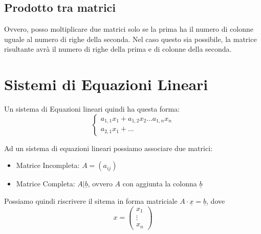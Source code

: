 \subsection{Prodotto tra matrici}
Ovvero, posso moltiplicare due matrici solo se la prima ha il numero di colonne uguale al numero di righe della seconda.
Nel caso questo sia possibile, la matrice risultante avrà il numero di righe della prima e di colonne della seconda.


\section{Sistemi di Equazioni Lineari}
Un sistema di Equazioni lineari quindi ha questa forma:
\[
	\begin{cases}
		a_{1,1} x_1 + a_{1,2}x_2 ... a_{1,n} x_n \\
		a_{2,1} x_1 + ...
	\end{cases}
\]

Ad un sistema di equazioni lineari possiamo associare due matrici:
\begin{itemize}
	\item Matrice Incompleta: $A=(a_{ij})$
	\item Matrice Completa: $A|\underline{b}$, ovvero $A$ con aggiunta la colonna $\underline{b}$
\end{itemize}
Possiamo quindi riscrivere il sitema in forma matriciale $A \cdot \underline{x} = \underline{b}$, dove
\[x=\begin{pmatrix}x_1\\\vdots\\x_n\end{pmatrix}\]

